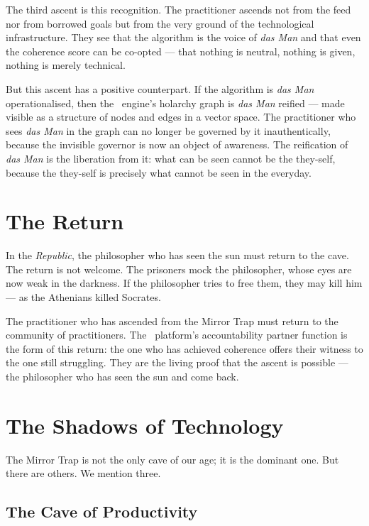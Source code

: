 The third ascent is this recognition. The practitioner ascends not from the feed
nor from borrowed goals but from the very ground of the technological
infrastructure. They see that the algorithm is the voice of \emph{das Man} and
that even the coherence score can be co-opted --- that nothing is neutral,
nothing is given, nothing is merely technical.

But this ascent has a positive counterpart. If the algorithm is \emph{das Man}
operationalised, then the \physis\ engine's holarchy graph is \emph{das Man}
reified --- made visible as a structure of nodes and edges in a vector space.
The practitioner who sees \emph{das Man} in the graph can no longer be governed
by it inauthentically, because the invisible governor is now an object of
awareness. The reification of \emph{das Man} is the liberation from it: what
can be seen cannot be the they-self, because the they-self is precisely what
cannot be seen in the everyday.

\section{The Return}

In the \emph{Republic}, the philosopher who has seen the sun must return to the
cave. The return is not welcome. The prisoners mock the philosopher, whose eyes
are now weak in the darkness. If the philosopher tries to free them, they may
kill him --- as the Athenians killed Socrates.

The practitioner who has ascended from the Mirror Trap must return to the
community of practitioners. The \praxis\ platform's accountability partner
function is the form of this return: the one who has achieved coherence offers
their witness to the one still struggling. They are the living proof that the
ascent is possible --- the philosopher who has seen the sun and come back.

\section{The Shadows of Technology}

The Mirror Trap is not the only cave of our age; it is the dominant one. But
there are others. We mention three.

\subsection{The Cave of Productivity}

